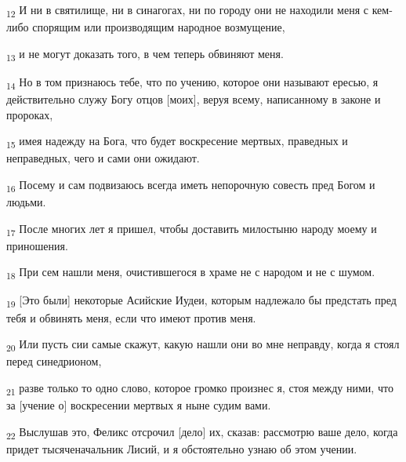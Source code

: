 \begin{tcolorbox}
\textsubscript{12} И ни в святилище, ни в синагогах, ни по городу они не находили меня с кем-либо спорящим или производящим народное возмущение,
\end{tcolorbox}
\begin{tcolorbox}
\textsubscript{13} и не могут доказать того, в чем теперь обвиняют меня.
\end{tcolorbox}
\begin{tcolorbox}
\textsubscript{14} Но в том признаюсь тебе, что по учению, которое они называют ересью, я действительно служу Богу отцов [моих], веруя всему, написанному в законе и пророках,
\end{tcolorbox}
\begin{tcolorbox}
\textsubscript{15} имея надежду на Бога, что будет воскресение мертвых, праведных и неправедных, чего и сами они ожидают.
\end{tcolorbox}
\begin{tcolorbox}
\textsubscript{16} Посему и сам подвизаюсь всегда иметь непорочную совесть пред Богом и людьми.
\end{tcolorbox}
\begin{tcolorbox}
\textsubscript{17} После многих лет я пришел, чтобы доставить милостыню народу моему и приношения.
\end{tcolorbox}
\begin{tcolorbox}
\textsubscript{18} При сем нашли меня, очистившегося в храме не с народом и не с шумом.
\end{tcolorbox}
\begin{tcolorbox}
\textsubscript{19} [Это были] некоторые Асийские Иудеи, которым надлежало бы предстать пред тебя и обвинять меня, если что имеют против меня.
\end{tcolorbox}
\begin{tcolorbox}
\textsubscript{20} Или пусть сии самые скажут, какую нашли они во мне неправду, когда я стоял перед синедрионом,
\end{tcolorbox}
\begin{tcolorbox}
\textsubscript{21} разве только то одно слово, которое громко произнес я, стоя между ними, что за [учение о] воскресении мертвых я ныне судим вами.
\end{tcolorbox}
\begin{tcolorbox}
\textsubscript{22} Выслушав это, Феликс отсрочил [дело] их, сказав: рассмотрю ваше дело, когда придет тысяченачальник Лисий, и я обстоятельно узнаю об этом учении.
\end{tcolorbox}
